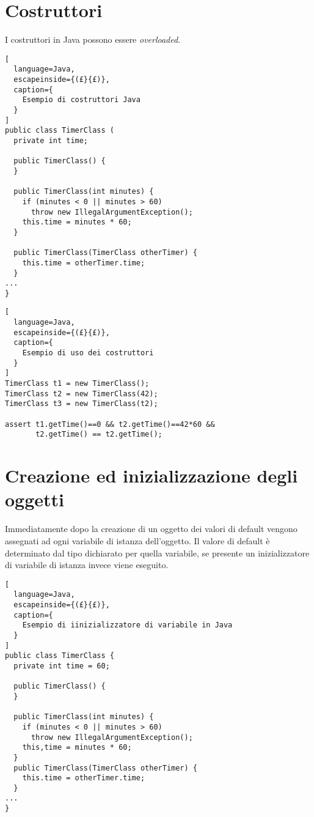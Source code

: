 \section{Costruttori}
I costruttori in Java possono essere \emph{overloaded}.
\begin{lstlisting}[
  language=Java,
  escapeinside={(£}{£)},
  caption={
    Esempio di costruttori Java
  }
]
public class TimerClass (
  private int time;

  public TimerClass() {
  }
  
  public TimerClass(int minutes) {
    if (minutes < 0 || minutes > 60)
      throw new IllegalArgumentException();
    this.time = minutes * 60;
  }

  public TimerClass(TimerClass otherTimer) {
    this.time = otherTimer.time;
  }
...
}
\end{lstlisting}

\begin{lstlisting}[
  language=Java,
  escapeinside={(£}{£)},
  caption={
    Esempio di uso dei costruttori
  }
]
TimerClass t1 = new TimerClass();
TimerClass t2 = new TimerClass(42);
TimerClass t3 = new TimerClass(t2);

assert t1.getTime()==0 && t2.getTime()==42*60 &&
       t2.getTime() == t2.getTime();
\end{lstlisting}

\section{Creazione ed inizializzazione degli oggetti}
Immediatamente dopo la creazione di un oggetto dei valori di default vengono
assegnati ad ogni variabile di istanza dell'oggetto.
Il valore di default è determinato dal tipo dichiarato per quella variabile, se
presente un inizializzatore di variabile di istanza invece viene eseguito.

\begin{lstlisting}[
  language=Java,
  escapeinside={(£}{£)},
  caption={
    Esempio di iinizializzatore di variabile in Java
  }
]
public class TimerClass {
  private int time = 60;

  public TimerClass() {
  }

  public TimerClass(int minutes) {
    if (minutes < 0 || minutes > 60)
      throw new IllegalArgumentException();
    this,time = minutes * 60;
  }
  public TimerClass(TimerClass otherTimer) {
    this.time = otherTimer.time;
  }
...
}
\end{lstlisting}

